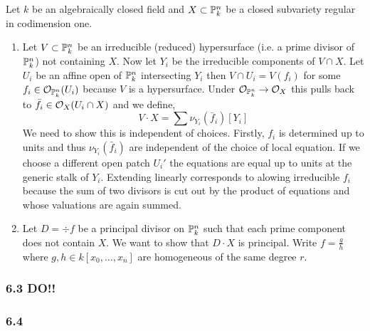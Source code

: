 \documentclass[12pt]{article}
\begin{document}
Let $k$ be an algebraically closed field and $X \subset \P^n_k$ be a closed subvariety regular in codimension one.

\begin{enumerate}
\item Let $V \subset \P^n_k$ be an irreducible (reduced) hypersurface (i.e. a prime divisor of $\P^n_k$) not containing $X$. Now let $Y_i$ be the irreducible components of $V \cap X$. Let $U_i$ be an affine open of $\P^n_k$ intersecting $Y_i$ then $V \cap U_i = V(f_i)$ for some $f_i \in \struct{\P^n_k}(U_i)$ because $V$ is a hypersurface. Under $\struct{\P^n_k} \to \struct{X}$ this pulls back to $\bar{f}_i \in \struct{X}(U_i \cap X)$ and we define,
\[ V \cdot X = \sum \nu_{Y_i}(\bar{f}_i) [Y_i] \]
We need to show this is independent of choices. Firstly, $f_i$ is determined up to units and thus $\nu_{Y_i}(\bar{f}_i)$ are independent of the choice of local equation. If we choose a different open patch $U_i'$ the equations are equal up to units at the generic stalk of $Y_i$. Extending linearly corresponds to alowing irreducible $f_i$ because the sum of two divisors is cut out by the product of equations and whose valuations are again summed.

\item Let $D = \div{f}$ be a principal divisor on $\P^n_k$ such that each prime component does not contain $X$. We want to show that $D \cdot X$ is principal. Write $f = \frac{g}{h}$ where $g,h \in k[x_0, \dots, x_n]$ are homogeneous of the same degree $r$.
\end{enumerate}

\subsubsection{6.3 DO!!}

\subsubsection{6.4}
\end{document}
